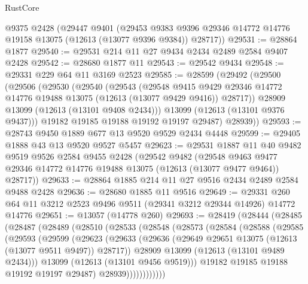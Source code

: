 \begin{lexlean}{RustCore}
\begin{coremodule}
    @9375
    @2428
    (@29447
      @9401
      (@29453 @9383 @9396 @29346 @14772 @14776 @19158 @13075 (@12613 (@13077 @9396 @9384)) @28717))
@29531 := @28864 @1877
@29540 := @29531 @214 @11 @27 @9434 @2434 @2489 @2584 @9407 @2428
@29542 := @28680 @1877 @11
@29543 := @29542 @9434
@29548 := @29331 @229 @64 @11 @3169 @2523
@29585 := @28599
    (@29492
      (@29500
        (@29506
          (@29530
            (@29540
              (@29543
                (@29548
                  @9415
                  @9429
                  @29346
                  @14772
                  @14776
                  @19488
                  @13075
                  (@12613 (@13077 @9429 @9416))
                  @28717))
              @28909
              @13099
              (@12613 (@13101 @9408 @2434)))
            @13099
            (@12613 (@13101 @9376 @9437)))
          @19182
          @19185
          @19188
          @19192
          @19197
          @29487)
        @28939))
@29593 := @28743 @9450 @1889 @677 @13 @9520 @9529 @2434 @4448
@29599 := @29405 @1888 @43 @13 @9520 @9527 @5457
@29623 := @29531
    @1887
    @11
    @40
    @9482
    @9519
    @9526
    @2584
    @9455
    @2428
    (@29542
      @9482
      (@29548 @9463 @9477 @29346 @14772 @14776 @19488 @13075 (@12613 (@13077 @9477 @9464)) @28717))
@29633 := @28864 @1885 @214 @11 @27 @9516 @2434 @2489 @2584 @9488 @2428
@29636 := @28680 @1885 @11 @9516
@29649 := @29331 @260 @64 @11 @3212 @2523 @9496 @9511 (@29341 @3212 @29344 @14926) @14772 @14776
@29651 := @13057 (@14778 @260)
@29693 := @28419
    (@28444
      (@28485
        (@28487
          (@28489
            (@28510
              (@28533
                (@28548
                  (@28573
                    (@28584
                      (@28588
                        (@29585
                          (@29593
                            (@29599
                              (@29623
                                (@29633
                                  (@29636
                                    (@29649 @29651 @13075 (@12613 (@13077 @9511 @9497)) @28717))
                                  @28909
                                  @13099
                                  (@12613 (@13101 @9489 @2434)))
                                @13099
                                (@12613 (@13101 @9456 @9519)))
                              @19182
                              @19185
                              @19188
                              @19192
                              @19197
                              @29487)
                            @28939))))))))))))

\end{coremodule}
\end{lexlean}

